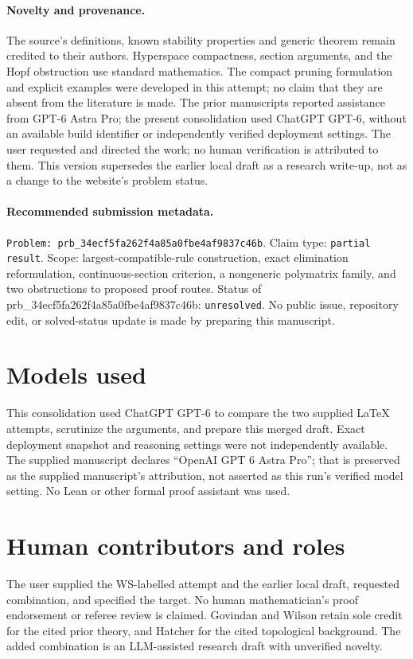 \documentclass[11pt]{article}
\theoremstyle{definition}
\begin{document}
\paragraph{Novelty and provenance.}
The source's definitions, known stability properties and generic theorem
remain credited to their authors. Hyperspace compactness, section arguments,
and the Hopf obstruction use standard mathematics. The compact pruning
formulation and explicit examples were developed in this attempt; no claim
that they are absent from the literature is made. The prior manuscripts reported assistance from GPT-6 Astra Pro;
the present consolidation used ChatGPT GPT-6, without an available build
identifier or independently verified deployment settings. The user requested
and directed the work; no human verification is attributed to them.
This version supersedes the earlier local draft as a research write-up,
not as a change to the website's problem status.

\paragraph{Recommended submission metadata.}
\texttt{Problem: prb_34ecf5fa262f4a85a0fbe4af9837c46b}. Claim type: \texttt{partial result}.
Scope: largest-compatible-rule construction, exact elimination reformulation,
continuous-section criterion, a nongeneric polymatrix family, and two
obstructions to proposed proof routes. Status of prb_34ecf5fa262f4a85a0fbe4af9837c46b: \texttt{unresolved}.
No public issue, repository edit, or solved-status update is made by preparing
this manuscript.

\section*{Models used}
This consolidation used ChatGPT GPT-6 to compare the two supplied
LaTeX attempts, scrutinize the arguments, and prepare this merged draft.
Exact deployment snapshot and reasoning settings were not independently
available. The supplied manuscript declares ``OpenAI GPT 6 Astra Pro'';
that is preserved as the supplied manuscript's attribution, not asserted
as this run's verified model setting. No Lean or other formal proof
assistant was used.

\section*{Human contributors and roles}
The user supplied the WS-labelled attempt and the earlier local draft,
requested combination, and specified the target. No human mathematician's
proof endorsement or referee review is claimed. Govindan and Wilson
retain sole credit for the cited prior theory, and Hatcher for the cited
topological background. The added combination is an LLM-assisted research
draft with unverified novelty.
\end{document}
